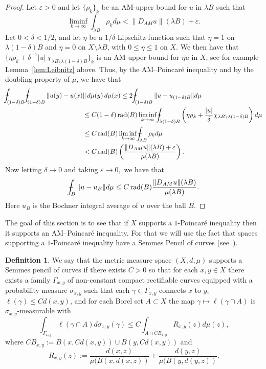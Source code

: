 \documentclass[11pt, letterpaper]{amsart} %
\newcommand*{\eps}{\varepsilon}
\providecommand*{\vint}[1]{\mathchoice
          {\mathop{\vrule width 5pt height 3 pt depth -2.5pt
                  \kern -9pt \kern 1pt\intop}\nolimits_{\kern -5pt{#1}}}
          {\mathop{\vrule width 5pt height 3 pt depth -2.6pt
                  \kern -6pt \intop}\nolimits_{\kern -3pt{#1}}}
          {\mathop{\vrule width 5pt height 3 pt depth -2.6pt
                  \kern -6pt \intop}\nolimits_{\kern -3pt{#1}}}
          {\mathop{\vrule width 5pt height 3 pt depth -2.6pt
                  \kern -6pt \intop}\nolimits_{\kern -3pt{#1}}}}
\DeclareMathOperator{\rad}{rad}
\numberwithin{equation}{section}
\theoremstyle{plain}
\theoremstyle{definition}
\newtheorem{definition}[equation]{Definition}
\begin{document}
{\begin{proof}
Let $\eps>0$ and let $\{\rho_k\}_k$ be an AM-upper bound for $u$ in $\lambda B$ such that 
\[
\liminf_{k\to\infty}\int_{\lambda B}\rho_kd\mu<\|D_{AM}u\|(\lambda B)+\eps.
\]
Let $0<\delta<1/2$,
and let $\eta$ be a $1/\delta$-Lipschitz function such that $\eta=1$ on 
$\lambda(1-\delta)B$ and $\eta=0$ on $X\setminus\lambda B$, with $0\le \eta\le 1$ on $X$.  We then have that 
$\{\eta\rho_k+\delta^{-1}|u|\,\chi_{\lambda B\setminus\lambda(1-\delta)B}\}_k$ is an AM-upper bound for $\eta u$ in $X$,
see for example Lemma~\ref{lem:Leibnitz} above.
Thus, by the AM--Poincar\'e inequality and by the doubling property of $\mu$, we have that 
\begin{align*}
\vint{(1-\delta)B}\vint{(1-\delta)B}\|u(y)-u(x)&\|\, d\mu(y)\, d\mu(x)\le 2\vint{(1-\delta)B}\|u-u_{(1-\delta)B}\|d\mu\\
&\le C(1-\delta)\rad(B)\liminf_{k\to\infty}\vint{\lambda(1-\delta)B}\left(\eta\rho_k
  +\frac{|u|}{\delta}\chi_{\lambda B\setminus\lambda(1-\delta)B}\right)d\mu\\
	&\le C\rad(B)\liminf_{k\to\infty}\vint{\lambda B}\rho_kd\mu\\
	&<C\rad(B)\left(\frac{\|D_{AM}u\|(\lambda B)+\eps}{\mu(\lambda B)}\right).
\end{align*}
Now letting $\delta\to 0$ and taking $\eps\to 0,$ we have that 
\[
\vint{B}\|u-u_B\|d\mu\le C\rad(B)\frac{\|D_{AM}u\|(\lambda B)}{\mu(\lambda B)}. 
\]
Here $u_B$ is the Bochner integral average of $u$ over the ball $B$.
\end{proof} 

The goal of this section is to see that if $X$ supports a $1$-Poincaré inequality then it supports an AM--Poincar\'e 
inequality. For that we will use the fact that spaces supporting a $1$-Poincaré inequality have a Semmes 
Pencil of curves (see~\cite[Theorem~3.10]{DEKS}).

\begin{definition}\label{def:SemmesPencil}
We say that the metric measure space $(X,d,\mu)$ supports a Semmes pencil of curves if there exists $C>0$ 
so that for each $x,y\in X$ there exists a 
family  $\Gamma_{x,y}$ of non-constant compact rectifiable curves equipped with a probability measure 
$\sigma_{x,y}$ such that each $\gamma\in\Gamma_{x,y}$ connects $x$ to $y$, $\ell (\gamma )\leq Cd(x,y)$, and for each 
Borel set $A\subset X$ the map $\gamma\mapsto \ell(\gamma\cap A)$ is $\sigma_{x,y}$-measurable with
\[
\int_{\Gamma_{x,y}} \ell (\gamma\cap A) d\sigma_{x,y} (\gamma )\leq C\int_{A\cap CB_{x,y}}R_{x,y}(z)d\mu (z),
\]
where $CB_{x,y}:=B(x,Cd(x,y))\cup B(y,Cd(x,y))$ and
\[
R_{x,y}(z):=\frac{d(x,z)}{\mu (B(x,d(x,z))}+\frac{d(y,z)}{\mu (B(y,d(y,z))}.
\]
\end{definition}


}
\end{document}
